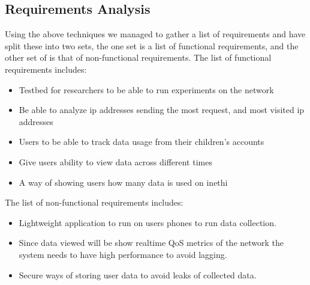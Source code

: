 \subsection{Requirements Analysis}\label{subsec:requirements-analysis}
Using the above techniques we managed to gather a list of requirements and have split these into two sets, the one set is a list of functional requirements, and the other set of is that of non-functional requirements.
The list of functional requirements includes:
\begin{itemize}
    \item Testbed for researchers to be able to run experiments on the network
    \item Be able to analyze ip addresses sending the most request, and most visited ip addresses
    \item Users to be able to track data usage from their children's accounts
    \item Give users ability to view data across different times
    \item A way of showing users how many data is used on inethi
\end{itemize}
The list of non-functional requirements includes:
\begin{itemize}
    \item Lightweight application to run on users phones to run data collection.
    \item Since data viewed will be show realtime QoS metrics of the network the system needs to have high performance to avoid lagging.
    \item Secure ways of storing user data to avoid leaks of collected data.
\end{itemize}
